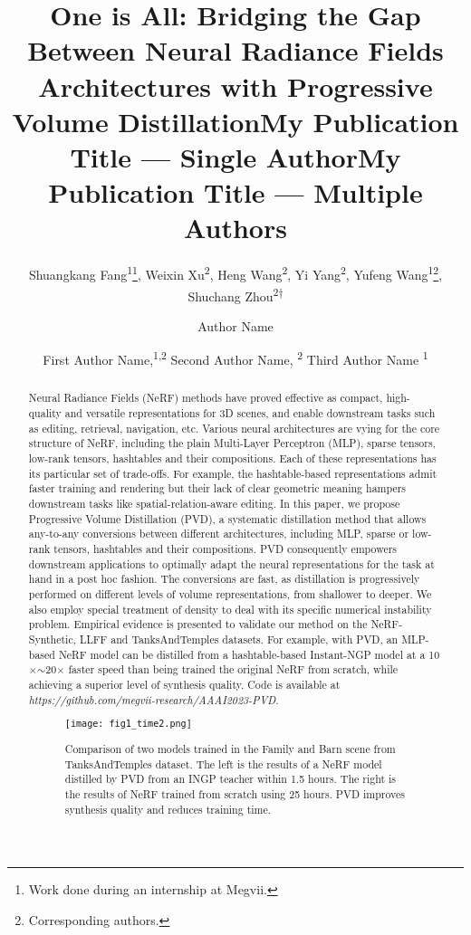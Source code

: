 \documentclass[letterpaper]{article} \usepackage{aaai23}  \usepackage{times}  \usepackage{helvet}  \usepackage{courier}  \usepackage[hyphens]{url}  \usepackage{graphicx} \urlstyle{rm} \def\UrlFont{\rm}  \usepackage{natbib}  \usepackage{caption} \frenchspacing  \setlength{\pdfpagewidth}{8.5in}  \setlength{\pdfpageheight}{11in}  \usepackage{multirow}
\title{One is All: Bridging the Gap Between Neural Radiance Fields Architectures with Progressive Volume Distillation}
\author{
Shuangkang Fang\textsuperscript{\rm 1}\thanks{Work done during an internship at Megvii.},
    Weixin Xu\textsuperscript{\rm 2},
    Heng Wang\textsuperscript{\rm 2},
    Yi Yang\textsuperscript{\rm 2},
    Yufeng Wang\textsuperscript{\rm 1}\thanks{Corresponding authors.},
    Shuchang Zhou\textsuperscript{\rm 2†}
}
\title{My Publication Title --- Single Author}
\author {
    Author Name
}
\title{My Publication Title --- Multiple Authors}
\author {
First Author Name,\textsuperscript{\rm 1,\rm 2}
    Second Author Name, \textsuperscript{\rm 2}
    Third Author Name \textsuperscript{\rm 1}
}
\begin{document}
\maketitle



\begin{abstract}
Neural Radiance Fields (NeRF) methods have proved effective as compact, high-quality and versatile representations for 3D scenes, and enable downstream tasks such as editing, retrieval, navigation, etc.  
Various neural architectures are vying for the core structure of NeRF, including the plain Multi-Layer Perceptron (MLP), sparse tensors, low-rank tensors, hashtables and their compositions. 
Each of these representations has its particular set of trade-offs. For example, the hashtable-based representations admit faster training and rendering but their lack of clear geometric meaning hampers downstream tasks like spatial-relation-aware editing. 
In this paper, we propose Progressive Volume Distillation (PVD), a systematic distillation method that allows any-to-any conversions between different architectures, including MLP, sparse or low-rank tensors, hashtables and their compositions. PVD consequently empowers downstream applications to optimally adapt the neural representations for the task at hand in a post hoc fashion. 
The conversions are fast, as distillation is progressively performed on different levels of volume representations, from shallower to deeper. We also employ special treatment of density to deal with its specific numerical instability problem.
Empirical evidence is presented to validate our method on the NeRF-Synthetic, LLFF and TanksAndTemples datasets. For example, with PVD, an MLP-based NeRF model can be distilled from a hashtable-based Instant-NGP model at a 10$\times$$\sim$20$\times$ faster speed than being trained the original NeRF from scratch, while achieving a superior level of synthesis quality. Code is available at \textit{https://github.com/megvii-research/AAAI2023-PVD}.


\begin{figure}[ht]
\centering
\texttt{[image: fig1\_time2.png]} \caption{Comparison of two models trained in the Family and Barn scene from TanksAndTemples dataset. The left is the results of a NeRF model distilled by PVD from an INGP teacher within 1.5 hours. The right is the results of NeRF trained from scratch using 25 hours. PVD improves synthesis quality and reduces training time.}
\label{fig-tank}
\end{figure}



\end{abstract}
\end{document}
